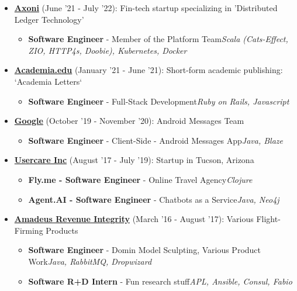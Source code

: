\documentclass{article}
\begin{document}
\begin{itemize}
\item \href{https://axoni.com}{\textbf{Axoni}} {(June '21 - July '22)}: Fin-tech startup specializing in 'Distributed Ledger Technology' 
\begin{itemize}
\item \textbf{Software Engineer} - Member of the Platform Team\newline \textit{Scala (Cats-Effect, ZIO, HTTP4s, Doobie), Kubernetes, Docker}
\end{itemize}

\item \href{https://academia.edu}{\textbf{Academia.edu}} {(January '21 - June '21)}: Short-form academic publishing: `Academia Letters` 
\begin{itemize}
\item \textbf{Software Engineer} - Full-Stack Development\newline \textit{Ruby on Rails, Javascript}
\end{itemize}

\item \href{https://google.com}{\textbf{Google}} {(October '19 - November '20)}: Android Messages Team 
\begin{itemize}
\item \textbf{Software Engineer} - Client-Side - Android Messages App\newline \textit{Java, Blaze}
\end{itemize}

\item \href{https://www.crunchbase.com/organization/usercare}{\textbf{Usercare Inc}} {(August '17 - July '19)}: Startup in Tucson, Arizona 
\begin{itemize}
\item \textbf{Fly.me - Software Engineer} - Online Travel Agency\newline \textit{Clojure}
\item \textbf{Agent.AI - Software Engineer} - Chatbots as a Service\newline \textit{Java, Neo4j}
\end{itemize}

\item \href{https://amadeus.com/en/portfolio/airlines/revenue-integrity}{\textbf{Amadeus Revenue Integrity}} {(March '16 - August '17)}: Various Flight-Firming Products 
\begin{itemize}
\item \textbf{Software Engineer} - Domin Model Sculpting, Various Product Work\newline \textit{Java, RabbitMQ, Dropwizard}
\item \textbf{Software R+D Intern} - Fun research stuff\newline \textit{APL, Ansible, Consul, Fabio}
\end{itemize}

\end{itemize}
\end{document}
